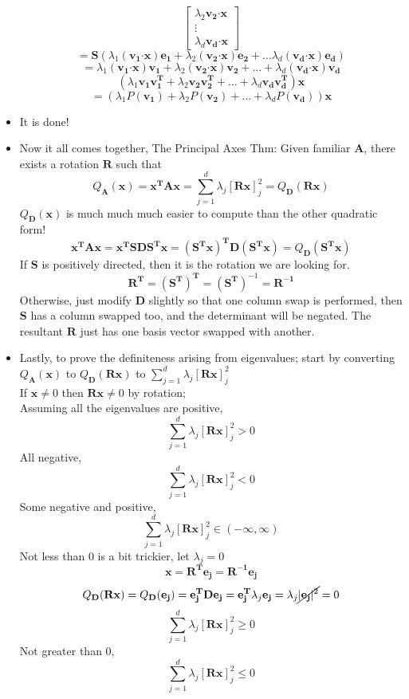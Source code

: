 \documentclass[10pt, oneside]{article}
\let\leq\leqslant
\let\geq\geqslant
\newcommand{\Cdot}{\boldsymbol{\cdot}}
\renewcommand{\vec}[1]{\mathbf{#1}}
\newcommand{\mat}[1]{\mathbf{#1}}
\begin{document}
\begin{itemize}
\[\begin{bmatrix}
                \lambda_2 \vec{v_2}\Cdot\vec{x}\\
                \vdots\\
                \lambda_d \vec{v_d}\Cdot\vec{x}
            \end{bmatrix}\]
            \[= \mat{S}\left( \lambda_1(\vec{v_1}\Cdot\vec{x})\vec{e_1} + \lambda_2(\vec{v_2}\Cdot\vec{x})\vec{e_2} + \hdots
            \lambda_d(\vec{v_d}\Cdot\vec{x})\vec{e_d}
            \right)\]
            \[=\lambda_1(\vec{v_1}\Cdot\vec{x})\vec{v_1} +
            \lambda_2(\vec{v_2}\Cdot\vec{x})\vec{v_2} +
            \hdots +
            \lambda_d(\vec{v_d}\Cdot\vec{x})\vec{v_d}\]
            \[(\lambda_1\vec{v_1}\vec{v_1^T} + \lambda_2\vec{v_2}\vec{v_2^T} +
            \hdots +
            \lambda_d\vec{v_d}\vec{v_d^T})\vec{x}\]
            \[= (\lambda_1 P(\vec{v_1}) + \lambda_2 P(\vec{v_2}) + \hdots + \lambda_d P(\vec{v_d}))\vec{x}\]
        \item It is done!
        \item Now it all comes together, The Principal Axes Thm: Given familiar $\mat{A}$, there exists a rotation $\mat{R}$ such that
                \[Q_\mat{A}(\vec{x}) = \vec{x^T}\mat{A}\vec{x} = \sum_{j=1}^d \lambda_j [\mat{R}\vec{x}]_j^2 = Q_\mat{D}(\mat{R}\vec{x})\]
            $Q_\mat{D}(\vec{x})$ is much much much easier to compute than the other quadratic form!
                \[\vec{x^T}\mat{A}\vec{x} = \vec{x^T}\mat{S}\mat{D}\mat{S^T}\vec{x} = (\mat{S^T}\vec{x})^\mat{T}\mat{D}(\mat{S^T}\vec{x}) = Q_\mat{D}(\mat{S^T}\vec{x})\]
            If $\mat{S}$ is positively directed, then it is the rotation we are looking for.
                \[\mat{R^T} = (\mat{S^T})^\mat{T} = (\mat{S^T})^{-1} = \mat{R^{-1}}\]    
            Otherwise, just modify $\mat{D}$ slightly so that one column swap is performed, then $\mat{S}$ has a column swapped too, and the determinant will be negated. The resultant $\mat{R}$ just has one basis vector swapped with another.
    \item Lastly, to prove the definiteness arising from eigenvalues; start by converting $Q_\mat{A}(\vec{x})$ to $Q_\mat{D}(\mat{R}\vec{x})$ to $\displaystyle\sum_{j=1}^d \lambda_j [\mat{R}\vec{x}]_j^2$\\
        If $\vec{x} \neq 0$ then $\mat{R}\vec{x} \neq 0$ by rotation;\\
        Assuming all the eigenvalues are positive,
            \[\sum_{j=1}^d \lambda_j [\mat{R}\vec{x}]_j^2 > 0\]
        All negative,
            \[\sum_{j=1}^d \lambda_j [\mat{R}\vec{x}]_j^2 < 0\]
        Some negative and positive,
            \[\sum_{j=1}^d \lambda_j [\mat{R}\vec{x}]_j^2 \in (-\infty,\infty)\]
        Not less than $0$ is a bit trickier, let $\lambda_j = 0$
            \[\vec{x} = \mat{R^T}\vec{e_j} = \mat{R^{-1}}\vec{e_j}\]
            \[Q_\mat{D}(\mat{R}\vec{x}) = Q_\mat{D}(\vec{e_j}) = \vec{e_j^T}\mat{D}\vec{e_j} = \vec{e_j^T}\lambda_j\vec{e_j} = \lambda_j \cancel{|\vec{e_j}|^2} = 0\]
            \[\sum_{j=1}^d \lambda_j [\mat{R}\vec{x}]_j^2 \geq 0\]
        Not greater than $0$,
            \[\sum_{j=1}^d \lambda_j [\mat{R}\vec{x}]_j^2 \leq 0\]
\end{itemize}
\end{document}
